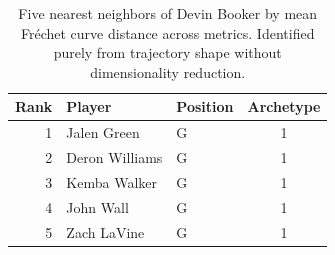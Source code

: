 \begin{table}[htbp]
  \centering\small
  \begin{tabular}{rllc}
    \toprule
    Rank & Player & Position & Archetype \\
    \midrule
    1 & Jalen Green & G & 1 \\
    2 & Deron Williams & G & 1 \\
    3 & Kemba Walker & G & 1 \\
    4 & John Wall & G & 1 \\
    5 & Zach LaVine & G & 1 \\
    \bottomrule
  \end{tabular}
  \caption{Five nearest neighbors of Devin Booker by mean Fr\'{e}chet curve distance across metrics. Identified purely from trajectory shape without dimensionality reduction.}
  \label{tab:Devin_Booker_frechet_curve_neighbors}
\end{table}


